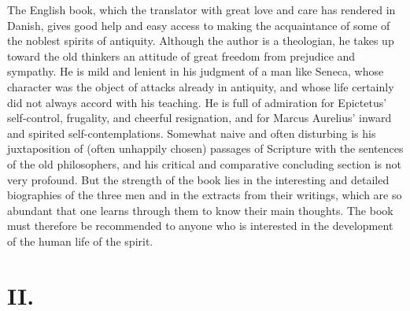\documentclass[12pt,a4paper,openany]{book}
\newcommand{\opage}[1]{\marginnote{\footnotesize\textit{[#1]}}}
\begin{document}
The English book, which the translator with great
love and care has rendered in Danish, gives good help
and easy access to making the acquaintance of some of the
noblest spirits of antiquity. Although the author is a theologian, he
\opage{162}takes up toward the old thinkers an attitude of great freedom from prejudice and sympathy.
He is mild and lenient in his judgment of
a man like Seneca, whose character was the object of
attacks already in antiquity, and whose life certainly did not
always accord with his teaching. He is full
of admiration for Epictetus' self-control, frugality, and
cheerful resignation, and for Marcus Aurelius' inward and
spirited self-contemplations. Somewhat naive and often
disturbing is his juxtaposition of (often unhappily chosen)
passages of Scripture with the sentences of the old philosophers, and his critical
and comparative concluding section is not very profound.
But the strength of the book lies in the interesting and detailed
biographies of the three men and in the extracts from their writings,
which are so abundant that one learns through them to know their
main thoughts. The book must therefore be recommended to anyone who
is interested in the development of the human life of the spirit.

\section*{II.}
\end{document}
